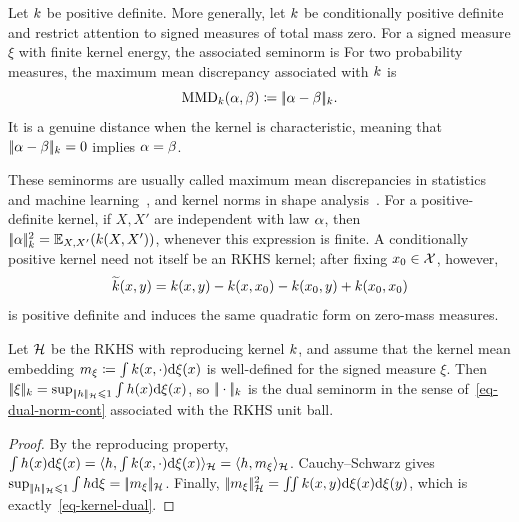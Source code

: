 \begin{defn}\label{def-kernel-mmd-norm}
	Let $k$ be positive definite. More generally, let $k$ be conditionally positive definite and restrict attention to signed measures of total mass zero. For a signed measure $\xi$ with finite kernel energy, the associated seminorm is
	For two probability measures, the maximum mean discrepancy associated with $k$ is
	\[
		\operatorname{MMD}_{k}(\alpha,\beta)\coloneqq|\!| \alpha-\beta |\!|_{k}.
	\]
It is a genuine distance when the kernel is characteristic, meaning that $|\!| \alpha-\beta |\!|_{k}=0$ implies $\alpha=\beta$.
\end{defn}

These seminorms are usually called maximum mean discrepancies in statistics and machine learning~\cite{gretton2012kernel,muandet2017kernel}, and kernel norms in shape analysis~\cite{Hofmann2008}. For a positive-definite kernel, if $X,X'$ are independent with law $\alpha$, then \(|\!| \alpha |\!|_{k}^2=\mathbb{E}_{X,X'}(k(X,X'))\), whenever this expression is finite. A conditionally positive kernel need not itself be an RKHS kernel; after fixing $x_0\in\mathcal{X}$, however,
\[
	\widetilde{k}(x,y)
	=k(x,y)-k(x,x_0)-k(x_0,y)+k(x_0,x_0)
\]
is positive definite and induces the same quadratic form on zero-mass measures.

\begin{prop}\label{prop-kernel-rkhs-dual}
	Let $\mathcal{H}$ be the RKHS with reproducing kernel $k$, and assume that the kernel mean embedding
	$m_\xi\coloneqq\int k(x,\cdot)\mathrm{d}\xi(x)$
	is well-defined for the signed measure $\xi$. Then
	$|\!| \xi |\!|_{k}
	=\sup_{|\!| h |\!|_{\mathcal{H}}\leqslant1}\int h(x)\mathrm{d}\xi(x)$,
	so $|\!| \cdot |\!|_{k}$ is the dual seminorm in the sense of~\eqref{eq-dual-norm-cont} associated with the RKHS unit ball.
\end{prop}
\begin{proof}
	By the reproducing property,
	$\int h(x)\mathrm{d}\xi(x)
	=\langle h,\int k(x,\cdot)\mathrm{d}\xi(x)\rangle_{\mathcal{H}}
	=\langle h,m_\xi\rangle_{\mathcal{H}}$.
	Cauchy--Schwarz gives
	$\sup_{|\!| h |\!|_{\mathcal{H}}\leqslant1}\int h\mathrm{d}\xi=|\!| m_\xi |\!|_{\mathcal{H}}$.
	Finally,
	$|\!| m_\xi |\!|_{\mathcal{H}}^2
	=\iint k(x,y)\mathrm{d}\xi(x)\mathrm{d}\xi(y)$,
	which is exactly~\eqref{eq-kernel-dual}.
\end{proof}

